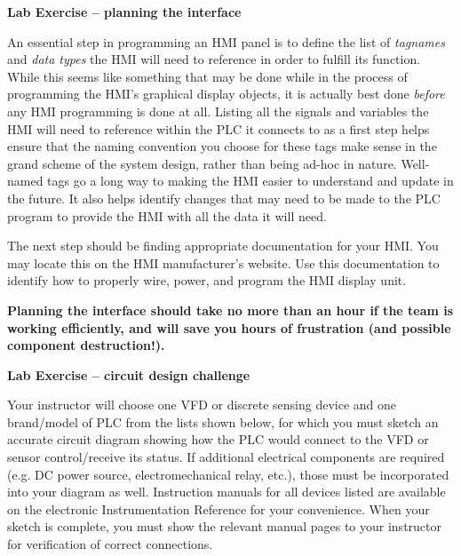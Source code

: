 \documentclass[12pt,a4paper]{article}
\begin{document}
\begin{itemize}
\vfil \eject

\noindent
{\bf Lab Exercise -- planning the interface}

\vskip 5pt

An essential step in programming an HMI panel is to define the list of {\it tagnames} and {\it data types} the HMI will need to reference in order to fulfill its function.  While this seems like something that may be done while in the process of programming the HMI's graphical display objects, it is actually best done {\it before} any HMI programming is done at all.  Listing all the signals and variables the HMI will need to reference within the PLC it connects to as a first step helps ensure that the naming convention you choose for these tags make sense in the grand scheme of the system design, rather than being ad-hoc in nature.  Well-named tags go a long way to making the HMI easier to understand and update in the future.  It also helps identify changes that may need to be made to the PLC program to provide the HMI with all the data it will need.

\vskip 10pt

The next step should be finding appropriate documentation for your HMI.  You may locate this on the HMI manufacturer's website.  Use this documentation to identify how to properly wire, power, and program the HMI display unit.

\vskip 10pt

{\bf Planning the interface should take no more than an hour if the team is working efficiently, and will save you hours of frustration (and possible component destruction!).}






\vfil \eject

\noindent
{\bf Lab Exercise -- circuit design challenge}

\vskip 5pt

Your instructor will choose one VFD or discrete sensing device and one brand/model of PLC from the lists shown below, for which you must sketch an accurate circuit diagram showing how the PLC would connect to the VFD or sensor control/receive its status.  If additional electrical components are required (e.g. DC power source, electromechanical relay, etc.), those must be incorporated into your diagram as well.  Instruction manuals for all devices listed are available on the electronic Instrumentation Reference for your convenience.  When your sketch is complete, you must show the relevant manual pages to your instructor for verification of correct connections.


\end{itemize}
\end{document}
